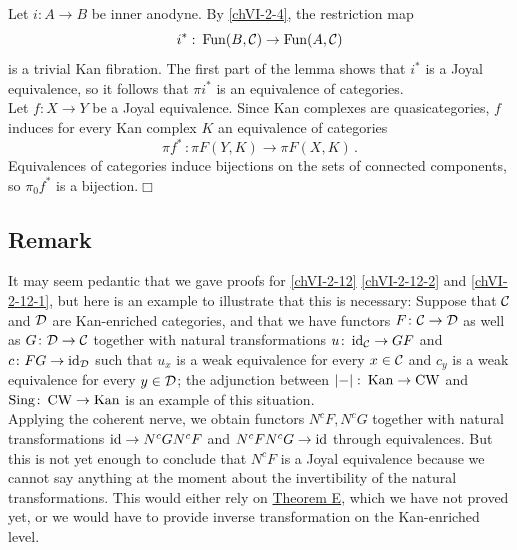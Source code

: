         Let $i \colon A \to B$ be inner anodyne. By \ref{chVI-2-4}, the restriction map
        \begin{equation*}
            i^{*} \,\colon \operatorname{Fun}(B, \mathcal{C}) \to \operatorname{Fun}(A, \mathcal{C})
        \end{equation*}
        is a trivial Kan fibration. The first part of the lemma shows that $i^{*}$ is a Joyal equivalence, so it follows that $\pi i^{*}$ is an equivalence of categories.\\
        Let $f \colon X \to Y$ be a Joyal equivalence. Since Kan complexes are quasicategories, $f$ induces for every Kan complex $K$ an equivalence of categories
        \begin{equation*}
            \pi f^{*} \,\colon \pi F(Y, K) \to \pi F(X, K) \,.
        \end{equation*}
        Equivalences of categories induce bijections on the sets of connected components, so $\pi_0 f^{*}$ is a bijection.\hfill$\Box$

    \subsection{Remark}\label{chVI-2-13}
        It may seem pedantic that we gave proofs for \ref{chVI-2-12} \ref{chVI-2-12-2} and \ref{chVI-2-12-1}, but here is an example to illustrate that this is necessary: Suppose that $\mathcal{C}$ and $\mathcal{D}$ are Kan-enriched categories, and that we have functors $F \colon \mathcal{C} \to \mathcal{D}$ as well as $G \colon \mathcal{D} \to \mathcal{C}$ together with natural transformations $u \colon \operatorname{id}_{\mathcal{C}} \to GF$ and $c \colon FG \to \operatorname{id}_{\mathcal{D}}$ such that $u_x$ is a weak equivalence for every $x \in \mathcal{C}$ and $c_y$ is a weak equivalence for every $y \in \mathcal{D}$; the adjunction between $\left| - \right| \colon \operatorname{Kan} \to \operatorname{CW}$ and $\operatorname{Sing} \colon \operatorname{CW} \to \operatorname{Kan}$ is an example of this situation.\\
        Applying the coherent nerve, we obtain functors $N^c F, N^c G$ together with natural transformations $\operatorname{id} \to N^c G N^c F$ and $N^c F N^c G \to \operatorname{id}$ through equivalences. But this is not yet enough to conclude that $N^c F$ is a Joyal equivalence because we cannot say anything at the moment about the invertibility of the natural transformations. This would either rely on \hyperref[chIII-thm-c]{Theorem E}, which we have not proved yet, or we would have to provide inverse transformation on the Kan-enriched level.

